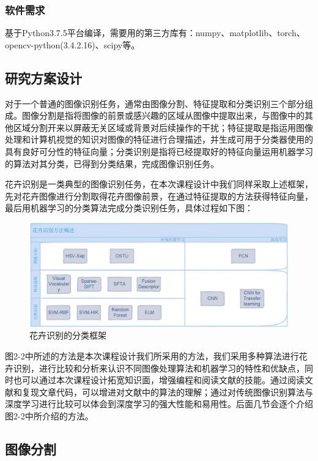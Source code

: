 \documentclass[supercite]{HustGraduPaper}
\begin{document}
\begin{sloppypar}
  \subsubsection{软件需求}
  基于Python3.7.5平台编译，需要用的第三方库有：numpy、matplotlib、torch、opencv-python(3.4.2.16)、scipy等。

  \subsection{研究方案设计}
  对于一个普通的图像识别任务，通常由图像分割、特征提取和分类识别三个部分组成。图像分割是指将图像的前景或感兴趣的区域从图像中提取出来，与图像中的其他区域分割开来以屏蔽无关区域或背景对后续操作的干扰；特征提取是指运用图像处理和计算机视觉的知识对图像的特征进行合理描述，并生成可用于分类器使用的具有良好可分性的特征向量；分类识别是指将已经提取好的特征向量运用机器学习的算法对其分类，已得到分类结果，完成图像识别任务。

  花卉识别是一类典型的图像识别任务，在本次课程设计中我们同样采取上述框架，先对花卉图像进行分割取得花卉图像前景，在通过特征提取的方法获得特征向量，最后用机器学习的分类算法完成分类识别任务，具体过程如下图：\begin{figure}[H]
  \setlength{\abovecaptionskip}{0.2cm}
  \setlength{\belowcaptionskip}{-0.cm}
    \centering%
    \includegraphics[scale=0.5]{3.jpg}
    \caption{花卉识别的分类框架}
  \end{figure}

  图2-2中所述的方法是本次课程设计我们所采用的方法，我们采用多种算法进行花卉识别，进行比较和分析来认识不同图像处理算法和机器学习的特性和优缺点，同时也可以通过本次课程设计拓宽知识面，增强编程和阅读文献的技能。通过阅读文献和复现文章代码，可以增进对文献中的算法的理解；通过对传统图像识别算法与深度学习进行比较可以体会到深度学习的强大性能和易用性。后面几节会逐个介绍图2-2中所介绍的方法。
  \subsection{图像分割}

\end{sloppypar}
\end{document}
